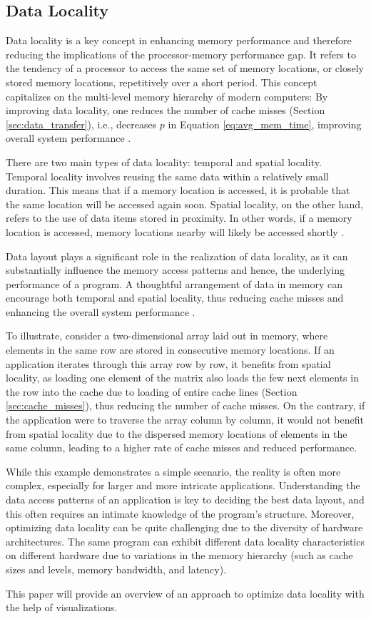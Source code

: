\subsection{Data Locality}\label{sec:data_locality}
Data locality is a key concept in enhancing memory performance and therefore reducing the implications of the processor-memory performance gap. It refers to the tendency of a processor to access the same set of memory locations, or closely stored memory locations, repetitively over a short period. This concept capitalizes on the multi-level memory hierarchy of modern computers: By improving data locality, one reduces the number of cache misses (Section \ref{sec:data_transfer}), i.e., decreases $p$ in Equation \ref{eq:avg_mem_time}, improving overall system performance \cite{unat2017trends, tate2014programming}.

There are two main types of data locality: temporal and spatial locality. Temporal locality involves reusing the same data within a relatively small duration. This means that if a memory location is accessed, it is probable that the same location will be accessed again soon. Spatial locality, on the other hand, refers to the use of data items stored in proximity. In other words, if a memory location is accessed, memory locations nearby will likely be accessed shortly \cite{esseghir1993improving}.

Data layout plays a significant role in the realization of data locality, as it can substantially influence the memory access patterns and hence, the underlying performance of a program. A thoughtful arrangement of data in memory can encourage both temporal and spatial locality, thus reducing cache misses and enhancing the overall system performance \cite{esseghir1993improving}.

To illustrate, consider a two-dimensional array laid out in memory, where elements in the same row are stored in consecutive memory locations. If an application iterates through this array row by row, it benefits from spatial locality, as loading one element of the matrix also loads the few next elements in the row into the cache due to loading of entire cache lines (Section \ref{sec:cache_misses}), thus reducing the number of cache misses. On the contrary, if the application were to traverse the array column by column, it would not benefit from spatial locality due to the dispersed memory locations of elements in the same column, leading to a higher rate of cache misses and reduced performance.

While this example demonstrates a simple scenario, the reality is often more complex, especially for larger and more intricate applications. Understanding the data access patterns of an application is key to deciding the best data layout, and this often requires an intimate knowledge of the program's structure. Moreover, optimizing data locality can be quite challenging due to the diversity of hardware architectures. The same program can exhibit different data locality characteristics on different hardware due to variations in the memory hierarchy (such as cache sizes and levels, memory bandwidth, and latency).

This paper will provide an overview of an approach to optimize data locality with the help of visualizations.
